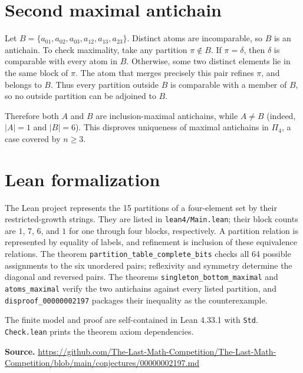 \documentclass[11pt]{article}
\begin{document}
\section*{Second maximal antichain}
Let $B=\{a_{01},a_{02},a_{03},a_{12},a_{13},a_{23}\}$. Distinct atoms are incomparable, so $B$ is an antichain. To check maximality, take any partition $\pi\notin B$. If $\pi=\delta$, then $\delta$ is comparable with every atom in $B$. Otherwise, some two distinct elements lie in the same block of $\pi$. The atom that merges precisely this pair refines $\pi$, and belongs to $B$. Thus every partition outside $B$ is comparable with a member of $B$, so no outside partition can be adjoined to $B$.

Therefore both $A$ and $B$ are inclusion-maximal antichains, while $A\neq B$ (indeed, $|A|=1$ and $|B|=6$). This disproves uniqueness of maximal antichains in $\Pi_4$, a case covered by $n\ge3$.

\section*{Lean formalization}
The Lean project represents the 15 partitions of a four-element set by their restricted-growth strings. They are listed in \texttt{lean4/Main.lean}; their block counts are $1$, $7$, $6$, and $1$ for one through four blocks, respectively. A partition relation is represented by equality of labels, and refinement is inclusion of these equivalence relations. The theorem \texttt{partition\_table\_complete\_bits} checks all 64 possible assignments to the six unordered pairs; reflexivity and symmetry determine the diagonal and reversed pairs. The theorems \texttt{singleton\_bottom\_maximal} and \texttt{atoms\_maximal} verify the two antichains against every listed partition, and \texttt{disproof\_00000002197} packages their inequality as the counterexample.

The finite model and proof are self-contained in Lean 4.33.1 with \texttt{Std}. \texttt{Check.lean} prints the theorem axiom dependencies.

\textbf{Source.} \url{https://github.com/The-Last-Math-Competition/The-Last-Math-Competition/blob/main/conjectures/00000002197.md}
\end{document}
